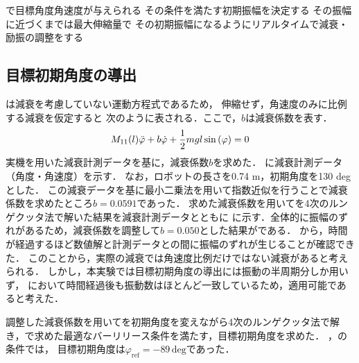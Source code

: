           で目標角度角速度が与えられる
          その条件を満たす初期振幅を決定する
          その振幅に近づくまでは最大伸縮量で
          その初期振幅になるようにリアルタイムで減衰・励振の調整をする

          
        \subsection{目標初期角度の導出}
          
          は減衰を考慮していない運動方程式であるため，
          伸縮せず，角速度のみに比例する減衰を仮定すると
          次のように表される．ここで，$b$は減衰係数を表す．
          \begin{eqnarray}
            \equlabel{dampingEquation}
            M_{11}(l)\ddot{\varphi}+b\dot{\varphi}+\frac{1}{2}mgl\sin{(\varphi)}=0          
            \end{eqnarray}
          実機を用いた減衰計測データを基に，減衰係数$b$を求めた．
          \figref{}に減衰計測データ（角度・角速度）を示す．
          なお，ロボットの長さを0.74 m，初期角度を130 degとした．
          この減衰データを基に最小二乗法を用いて指数近似を行うことで減衰係数を求めたところ$b=0.0591$であった．
          求めた減衰係数を用いてを4次のルンゲクッタ法で解いた結果を減衰計測データとともに
          \figref{}に示す．全体的に振幅のずれがあるため，減衰係数を調整して$b=0.050$とした結果が\figref{}である．
          \figref{}から，時間が経過するほど数値解と計測データとの間に振幅のずれが生じることが確認できた．
          このことから，実際の減衰では角速度比例だけではない減衰があると考えられる．
          しかし，本実験では目標初期角度の導出には振動の半周期分しか用いず，
          \figref{}において時間経過後も振動数はほとんど一致しているため，適用可能であると考えた．

          調整した減衰係数を用いてを初期角度を変えながら4次のルンゲクッタ法で解き，で求めた最適なバーリリース条件を満たす，目標初期角度を求めた．
          ，の条件では，
          目標初期角度は$\varphi_{\mathrm{ref}}=-89\,\mathrm{deg}$であった．
          


